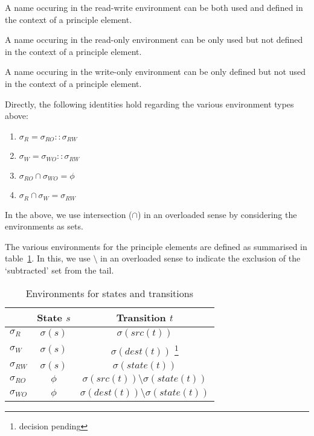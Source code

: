 \documentclass[12pt,a4paper]{report}
\begin{document}
\begin{definition}
	A name occuring in the read-write environment can be both used and defined in the context of a principle element. 
\end{definition}


\begin{definition}
	A name occuring in the read-only environment can be only used but not defined in the context of a principle element. 
\end{definition}


\begin{definition}
	A name occuring in the write-only environment can be only defined but not used in the context of a principle element. 
\end{definition}

Directly, the following identities hold regarding the various environment types above:
\begin{enumerate}
	\item $\sigma_R = \sigma_{RO} :: \sigma_{RW}$
	\item $\sigma_W = \sigma_{WO} :: \sigma_{RW}$
	\item $\sigma_{RO} \cap \sigma_{WO} = \phi$
	\item $\sigma_{R} \cap \sigma_{W} = \sigma_{RW}$
\end{enumerate}

In the above, we use intersection ($\cap$) in an overloaded sense by considering the environments as sets.

The various environments for the principle elements are defined as summarised in table~\ref{t:env}. In this, we use $\setminus$ in an overloaded sense to indicate the exclusion of the `subtracted' set from the tail.
 
\begin{table}
\begin{center}
\begin{tabular}{| l | c | c |}
\hline
	          & \textbf{State} $s$   & \textbf{Transition} $t$ \\
\hline
	$\sigma_R$ & $\sigma(s)$ & $\sigma(src(t))$ \\
	$\sigma_W$ & $\sigma(s)$ & $\sigma(dest(t))$ \footnote{decision pending} \\
	$\sigma_{RW}$ & $\sigma(s)$ & $\sigma(state(t))$ \\
	$\sigma_{RO}$ & $\phi$ & $\sigma(src(t)) \setminus \sigma(state(t))$ \\
	$\sigma_{WO}$ & $\phi$ & $\sigma(dest(t)) \setminus \sigma(state(t))$ \\
\hline
\end{tabular}
\end{center}
\caption{Environments for states and transitions}
\label{t:env}
\end{table}
\end{document}
